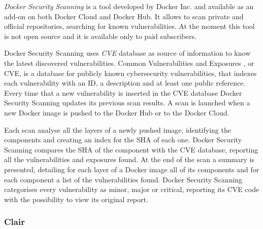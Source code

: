 \documentclass[a4paper,12pt]{article}
\begin{document}
\textit{Docker Security Scanning} \cite{docker_security_scanning} is a tool
developed by Docker Inc. and available as an add-on on both Docker Cloud and
Docker Hub. It allows to scan private and official repositories, searching for
known vulnerabilities. At the moment this tool is not open source and it is
available only to paid subscribers. \par Docker Security Scanning uses
\textit{CVE} database as source of information to know the latest discovered
vulnerabilities. Common Vulnerabilities and Exposures
\cite{common_vulnerabilities_exposures}, or CVE, is a database for publicly
known cybersecurity vulnerabilities, that indexes each vulnerability with an
ID, a description and at least one public reference. Every time that a new
vulnerability is inserted in the CVE database Docker Security Scanning updates
its previous scan results. A scan is launched when a new Docker image is pushed
to the Docker Hub or to the Docker Cloud. \par Each scan analyse all the layers
of a newly pushed image, identifying the components and creating an index for the
SHA of each one. Docker Security Scanning compares the SHA of the component with
the CVE database, reporting all the vulnerabilities and exposures found. At the
end of the scan a summary is presented, detailing for each layer of a Docker
image all of its components and for each component a list of the vulnerabilities
found. Docker Security Scanning categorises every vulnerability as minor, major
or critical, reporting its CVE code with the possibility to view its original
report.  

\subsubsection{Clair}
\end{document}

